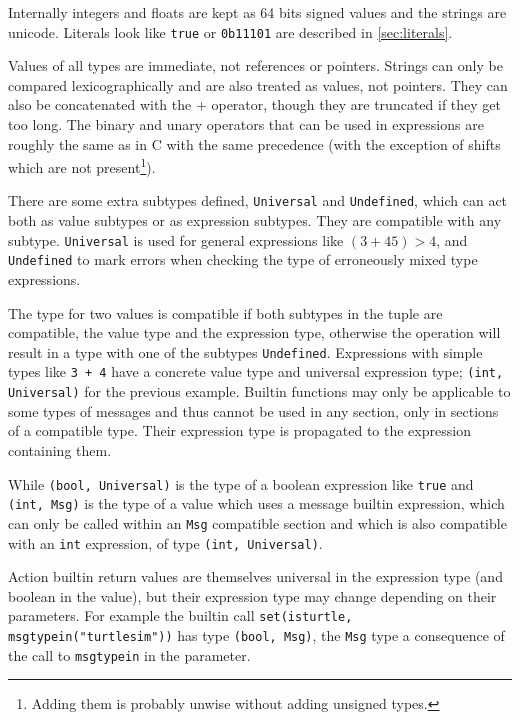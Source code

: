 \documentclass[a4paper]{article}
\begin{document}
Internally integers and floats are kept as 64 bits signed values and
the strings are unicode.
Literals look like \verb+true+ or \verb+0b11101+ are described in \ref{sec:literals}.

Values of all types are immediate, not references
or pointers.  Strings can only be compared lexicographically and are
also treated as values, not pointers. They can also be concatenated with
the $+$ operator,
though they are truncated if they get too long.  The binary and unary
operators that can be used in expressions are roughly the same as in
C with the same precedence (with the exception of shifts which are not present\footnote{
Adding them is probably unwise without adding unsigned types.}).


There are some extra subtypes defined, \texttt{Universal} and
\texttt{Undefined}, which can act both as value subtypes or as expression
subtypes. They are compatible with any subtype. \texttt{Universal}
is used for general expressions like $(3 + 45) > 4$,
and \texttt{Undefined} to mark errors
when checking the type of erroneously mixed type expressions.


The type for two values is compatible if both subtypes in the tuple are compatible,
the value type and the expression type, otherwise the operation will result in a type with
one of the subtypes \texttt{Undefined}.
Expressions with simple types like \verb-3 + 4- have a concrete value
type and universal expression type;
\verb+(int, Universal)+ for the previous example.
Builtin functions may only be applicable to some types of messages and thus
cannot be used in any section, only in sections of a compatible type.
Their expression type is propagated to the expression containing them.

While \verb+(bool, Universal)+ is the type of a boolean expression
like \verb+true+ and \verb+(int, Msg)+ is the type of a value which uses
a message builtin expression, which can only be called within an \texttt{Msg}
compatible section and which is also compatible with an \verb+int+ expression,
of type  \verb+(int, Universal)+.

Action builtin return values are themselves universal in the expression type
(and boolean in the value), but their expression type may change depending
on their parameters.
For example the builtin call
\verb+set(isturtle, msgtypein("turtlesim"))+
has type \verb+(bool, Msg)+, the \verb+Msg+ type a
consequence of the call to \verb+msgtypein+ in the
parameter.

\end{document}
